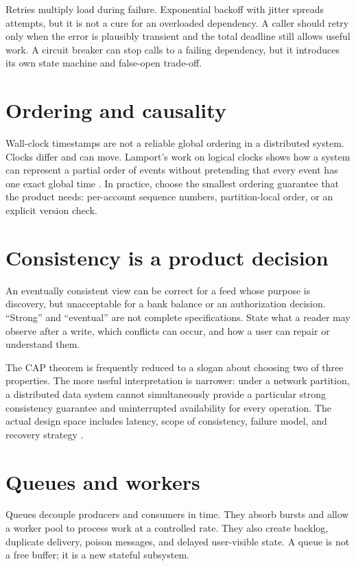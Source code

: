 Retries multiply load during failure. Exponential backoff with jitter spreads
attempts, but it is not a cure for an overloaded dependency. A caller should
retry only when the error is plausibly transient and the total deadline still
allows useful work. A circuit breaker can stop calls to a failing dependency,
but it introduces its own state machine and false-open trade-off.

\section{Ordering and causality}
Wall-clock timestamps are not a reliable global ordering in a distributed system.
Clocks differ and can move. Lamport's work on logical clocks shows how a system
can represent a partial order of events without pretending that every event has
one exact global time \cite{lamport1978time}. In practice, choose the smallest
ordering guarantee that the product needs: per-account sequence numbers,
partition-local order, or an explicit version check.

\section{Consistency is a product decision}
An eventually consistent view can be correct for a feed whose purpose is
discovery, but unacceptable for a bank balance or an authorization decision.
“Strong” and “eventual” are not complete specifications. State what a reader may
observe after a write, which conflicts can occur, and how a user can repair or
understand them.

The CAP theorem is frequently reduced to a slogan about choosing two of three
properties. The more useful interpretation is narrower: under a network
partition, a distributed data system cannot simultaneously provide a particular
strong consistency guarantee and uninterrupted availability for every operation.
The actual design space includes latency, scope of consistency, failure model,
and recovery strategy \cite{brewer2012cap}.

\section{Queues and workers}
Queues decouple producers and consumers in time. They absorb bursts and allow a
worker pool to process work at a controlled rate. They also create backlog,
duplicate delivery, poison messages, and delayed user-visible state. A queue is
not a free buffer; it is a new stateful subsystem.

